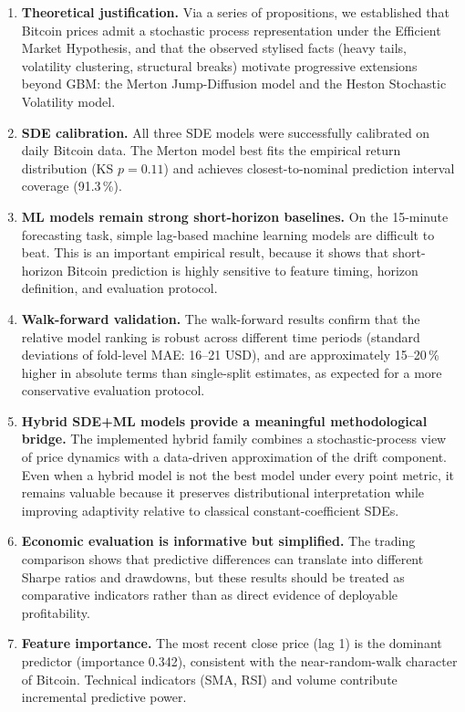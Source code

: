 \documentclass[12pt, a4paper, oneside]{report}
\theoremstyle{plain}
\theoremstyle{definition}
\theoremstyle{remark}
\begin{document}
\begin{enumerate}[leftmargin=1.25cm, label=\arabic*.]
  \item \textbf{Theoretical justification.}  Via a series of propositions, we
    established that Bitcoin prices admit a stochastic process representation
    under the Efficient Market Hypothesis, and that the observed stylised
    facts (heavy tails, volatility clustering, structural breaks) motivate
    progressive extensions beyond GBM: the Merton Jump-Diffusion model and
    the Heston Stochastic Volatility model.

  \item \textbf{SDE calibration.}  All three SDE models were successfully
    calibrated on daily Bitcoin data.  The Merton model best fits the empirical
    return distribution (KS $p = 0.11$) and achieves closest-to-nominal
    prediction interval coverage (91.3\,\%).

  \item \textbf{ML models remain strong short-horizon baselines.}  On the
    15-minute forecasting task, simple lag-based machine learning models are
    difficult to beat.  This is an important empirical result, because it shows
    that short-horizon Bitcoin prediction is highly sensitive to feature timing,
    horizon definition, and evaluation protocol.

  \item \textbf{Walk-forward validation.}  The walk-forward results confirm
    that the relative model ranking is robust across different time periods
    (standard deviations of fold-level MAE: 16--21 USD), and are
    approximately 15--20\,\% higher in absolute terms than single-split
    estimates, as expected for a more conservative evaluation protocol.

  \item \textbf{Hybrid SDE+ML models provide a meaningful methodological
    bridge.}  The implemented hybrid family combines a stochastic-process view
    of price dynamics with a data-driven approximation of the drift component.
    Even when a hybrid model is not the best model under every point metric, it
    remains valuable because it preserves distributional interpretation while
    improving adaptivity relative to classical constant-coefficient SDEs.

  \item \textbf{Economic evaluation is informative but simplified.}  The
    trading comparison shows that predictive differences can translate into
    different Sharpe ratios and drawdowns, but these results should be treated
    as comparative indicators rather than as direct evidence of deployable
    profitability.

  \item \textbf{Feature importance.}  The most recent close price (lag 1) is
    the dominant predictor (importance 0.342), consistent with the near-random-walk
    character of Bitcoin.  Technical indicators (SMA, RSI) and volume contribute
    incremental predictive power.
\end{enumerate}
\end{document}
